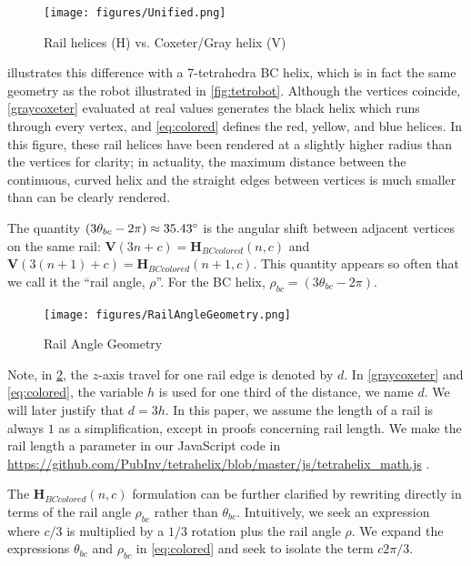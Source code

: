 \documentclass[twocolumn,10pt]{asme2ej}
\renewcommand{\vec}[1]{\mathbf{#1}}
\begin{document}
\begin{figure}
  \centering
     \texttt{[image: figures/Unified.png]}
     \caption{Rail helices (H) vs. Coxeter/Gray helix (V) }
  \label{fig:helixcomparison}  
\end{figure}

 illustrates this difference with a 7-tetrahedra BC helix, which is
in fact the same geometry as the robot illustrated in \cref{fig:tetrobot}.
Although the vertices coincide,
 \cref{graycoxeter} evaluated
at real values generates the black helix which runs through every vertex, and \cref{eq:colored} defines
the red, yellow, and blue helices. In this figure,
these rail helices have been rendered at a slightly higher radius than the vertices for clarity;
in actuality, the maximum distance between the continuous, curved helix and the
straight edges between vertices is much smaller than can be clearly rendered.

The quantity $ (3 \theta_{bc} - 2 \pi) \approx 35.43 \degree $  is the angular shift between
adjacent vertices on the same rail:
$ \vec{V}(3n + c)= \vec{H}_{BCcolored}(n,c)$ and
$ \vec{V}(3(n+1)+c)= \vec{H}_{BCcolored}(n+1,c)$.
This quantity appears so often that we call it the ``rail angle, $\rho$''. For the BC helix, $\rho_{bc} = (3 \theta_{bc} - 2 \pi)$.

\begin{figure}
     \centering
     \texttt{[image: figures/RailAngleGeometry.png]}
     \caption{Rail Angle Geometry}
  \label{railanglefig}
\end{figure}

Note, in \cref{railanglefig}, the $z$-axis travel for one rail edge is denoted by $d$. In \cref{graycoxeter} and  \cref{eq:colored}, the variable
$h$ is used for one third of the distance, we name $d$. We will later justify that $d = 3h$.
In this paper, we assume the length of a rail
is always $1$ as a simplification, except in proofs concerning rail length.
We make the rail length a parameter in our JavaScript code in
\url{https://github.com/PubInv/tetrahelix/blob/master/js/tetrahelix_math.js} \cite{readtetrahelix}.

The $\vec{H}_{BCcolored}(n,c)$ formulation can be further clarified by rewriting directly in terms of the rail angle $\rho_{bc}$ rather than $\theta_{bc}$.
Intuitively, we seek an expression where $c/3$ is multiplied by a $1/3$ rotation plus the rail angle $\rho$.
We expand 
the expressions $\theta_{bc}$ and $\rho_{bc}$ in \cref{eq:colored} and seek to isolate the term $c 2\pi/3 $.
\end{document}
